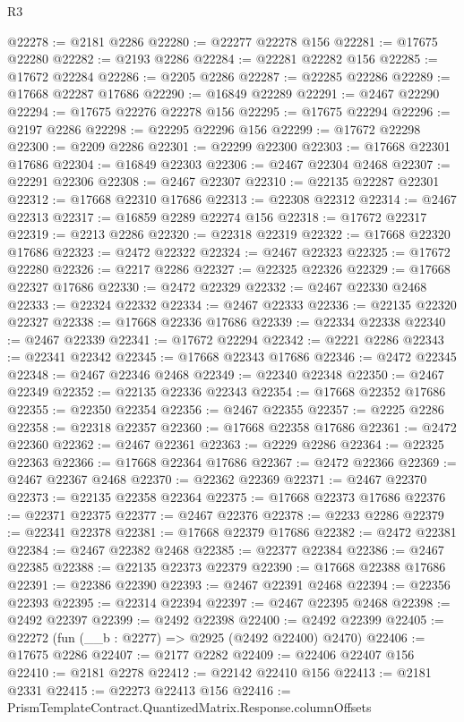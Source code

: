\begin{lexlean}{R3}
\begin{coremodule}
@22278 := @2181 @2286
@22280 := @22277 @22278 @156
@22281 := @17675 @22280
@22282 := @2193 @2286
@22284 := @22281 @22282 @156
@22285 := @17672 @22284
@22286 := @2205 @2286
@22287 := @22285 @22286
@22289 := @17668 @22287 @17686
@22290 := @16849 @22289
@22291 := @2467 @22290
@22294 := @17675 @22276 @22278 @156
@22295 := @17675 @22294
@22296 := @2197 @2286
@22298 := @22295 @22296 @156
@22299 := @17672 @22298
@22300 := @2209 @2286
@22301 := @22299 @22300
@22303 := @17668 @22301 @17686
@22304 := @16849 @22303
@22306 := @2467 @22304 @2468
@22307 := @22291 @22306
@22308 := @2467 @22307
@22310 := @22135 @22287 @22301
@22312 := @17668 @22310 @17686
@22313 := @22308 @22312
@22314 := @2467 @22313
@22317 := @16859 @2289 @22274 @156
@22318 := @17672 @22317
@22319 := @2213 @2286
@22320 := @22318 @22319
@22322 := @17668 @22320 @17686
@22323 := @2472 @22322
@22324 := @2467 @22323
@22325 := @17672 @22280
@22326 := @2217 @2286
@22327 := @22325 @22326
@22329 := @17668 @22327 @17686
@22330 := @2472 @22329
@22332 := @2467 @22330 @2468
@22333 := @22324 @22332
@22334 := @2467 @22333
@22336 := @22135 @22320 @22327
@22338 := @17668 @22336 @17686
@22339 := @22334 @22338
@22340 := @2467 @22339
@22341 := @17672 @22294
@22342 := @2221 @2286
@22343 := @22341 @22342
@22345 := @17668 @22343 @17686
@22346 := @2472 @22345
@22348 := @2467 @22346 @2468
@22349 := @22340 @22348
@22350 := @2467 @22349
@22352 := @22135 @22336 @22343
@22354 := @17668 @22352 @17686
@22355 := @22350 @22354
@22356 := @2467 @22355
@22357 := @2225 @2286
@22358 := @22318 @22357
@22360 := @17668 @22358 @17686
@22361 := @2472 @22360
@22362 := @2467 @22361
@22363 := @2229 @2286
@22364 := @22325 @22363
@22366 := @17668 @22364 @17686
@22367 := @2472 @22366
@22369 := @2467 @22367 @2468
@22370 := @22362 @22369
@22371 := @2467 @22370
@22373 := @22135 @22358 @22364
@22375 := @17668 @22373 @17686
@22376 := @22371 @22375
@22377 := @2467 @22376
@22378 := @2233 @2286
@22379 := @22341 @22378
@22381 := @17668 @22379 @17686
@22382 := @2472 @22381
@22384 := @2467 @22382 @2468
@22385 := @22377 @22384
@22386 := @2467 @22385
@22388 := @22135 @22373 @22379
@22390 := @17668 @22388 @17686
@22391 := @22386 @22390
@22393 := @2467 @22391 @2468
@22394 := @22356 @22393
@22395 := @22314 @22394
@22397 := @2467 @22395 @2468
@22398 := @2492 @22397
@22399 := @2492 @22398
@22400 := @2492 @22399
@22405 := @22272 (fun (__b : @2277) => @2925 (@2492 @22400) @2470)
@22406 := @17675 @2286
@22407 := @2177 @2282
@22409 := @22406 @22407 @156
@22410 := @2181 @2278
@22412 := @22142 @22410 @156
@22413 := @2181 @2331
@22415 := @22273 @22413 @156
@22416 := PrismTemplateContract.QuantizedMatrix.Response.columnOffsets

\end{coremodule}
\end{lexlean}
